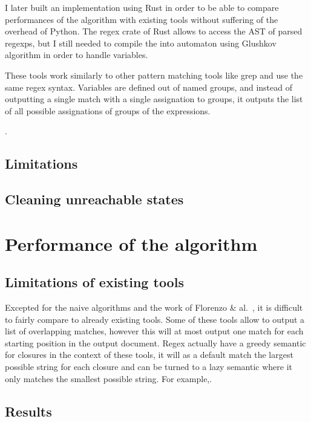 \documentclass[12px]{article}
\begin{document}
      I later built an implementation using Rust in order to be able to compare
      performances of the algorithm with existing tools without suffering of
      the overhead of Python. The regex crate of Rust allows to access the
      AST of parsed regexps, but I still needed to compile the into automaton
      using Glushkov algorithm in order to handle variables.

      These tools work similarly to other pattern matching tools like grep and
      use the same regex syntax. Variables are defined out of named groups, and
      instead of outputting a single match with a single assignation to groups,
      it outputs the list of all possible assignations of groups of the
      expressions.

      .

    \subsection{Limitations}


    \subsection{Cleaning unreachable states}


  \section{Performance of the algorithm}

    \subsection{Limitations of existing tools}

      Excepted for the naive algorithms and the work of Florenzo &
      al.~, it is difficult to fairly compare to already
      existing tools. Some of these tools allow to output a list of overlapping
      matches, however this will at most output one match for each starting
      position in the output document. Regex actually have a greedy semantic
      for closures in the context of these tools, it will as a default match
      the largest possible string for each closure and can be turned to a lazy
      semantic where it only matches the smallest possible string. For
      example,.

    \subsection{Results}


  \pagebreak
  
  
\end{document}
